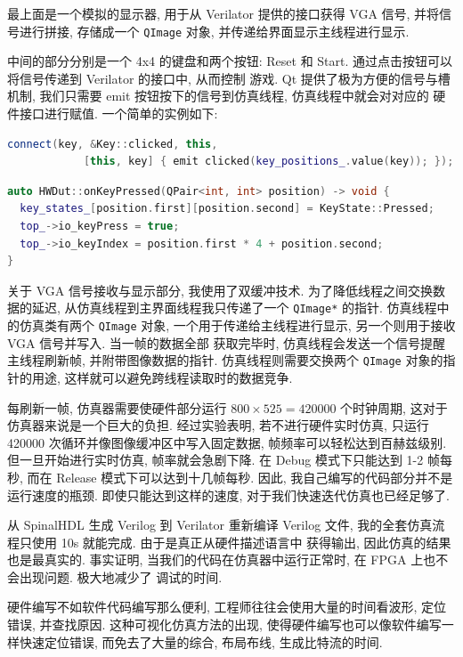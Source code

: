 最上面是一个模拟的显示器, 用于从
Verilator 提供的接口获得 VGA 信号, 并将信号进行拼接, 存储成一个 \texttt{QImage} 对象, 并传递给界面显示主线程进行显示. 

中间的部分分别是一个 4x4 的键盘和两个按钮: Reset 和 Start. 通过点击按钮可以将信号传递到 Verilator 的接口中, 从而控制
游戏. Qt 提供了极为方便的信号与槽机制, 我们只需要 emit 按钮按下的信号到仿真线程, 仿真线程中就会对对应的
硬件接口进行赋值. 一个简单的实例如下: 

\begin{lstlisting}[language=c++, title={按下键盘按钮时发送信号}]
    connect(key, &Key::clicked, this,
            [this, key] { emit clicked(key_positions_.value(key)); });
\end{lstlisting}

\begin{lstlisting}[language=c++, title={仿真线程中的信号处理}]
auto HWDut::onKeyPressed(QPair<int, int> position) -> void {
  key_states_[position.first][position.second] = KeyState::Pressed;
  top_->io_keyPress = true;
  top_->io_keyIndex = position.first * 4 + position.second;
}
\end{lstlisting}

关于 VGA 信号接收与显示部分, 我使用了双缓冲技术. 为了降低线程之间交换数据的延迟, 从仿真线程到主界面线程我只传递了一个 \texttt{QImage*}
的指针. 仿真线程中的仿真类有两个 \texttt{QImage} 对象, 一个用于传递给主线程进行显示, 另一个则用于接收 VGA 信号并写入. 当一帧的数据全部
获取完毕时, 仿真线程会发送一个信号提醒主线程刷新帧, 并附带图像数据的指针. 仿真线程则需要交换两个 \texttt{QImage} 对象的指针的用途, 
这样就可以避免跨线程读取时的数据竞争.

每刷新一帧, 仿真器需要使硬件部分运行 $800 \times 525 = 420000$ 个时钟周期, 这对于仿真器来说是一个巨大的负担.
经过实验表明, 若不进行硬件实时仿真, 只运行 420000 次循环并像图像缓冲区中写入固定数据, 帧频率可以轻松达到百赫兹级别. 
但一旦开始进行实时仿真, 帧率就会急剧下降. 在 Debug 模式下只能达到 1-2 帧每秒, 而在 Release 模式下可以达到十几帧每秒.
因此, 我自己编写的代码部分并不是运行速度的瓶颈. 即使只能达到这样的速度, 对于我们快速迭代仿真也已经足够了. 

从 SpinalHDL 生成 Verilog 到 Verilator 重新编译 Verilog 文件, 我的全套仿真流程只使用 10s 就能完成. 由于是真正从硬件描述语言中
获得输出, 因此仿真的结果也是最真实的. 事实证明, 当我们的代码在仿真器中运行正常时, 在 FPGA 上也不会出现问题. 极大地减少了
调试的时间.

硬件编写不如软件代码编写那么便利, 工程师往往会使用大量的时间看波形, 定位错误, 并查找原因. 这种可视化仿真方法的出现, 
使得硬件编写也可以像软件编写一样快速定位错误, 而免去了大量的综合, 布局布线, 生成比特流的时间. 

